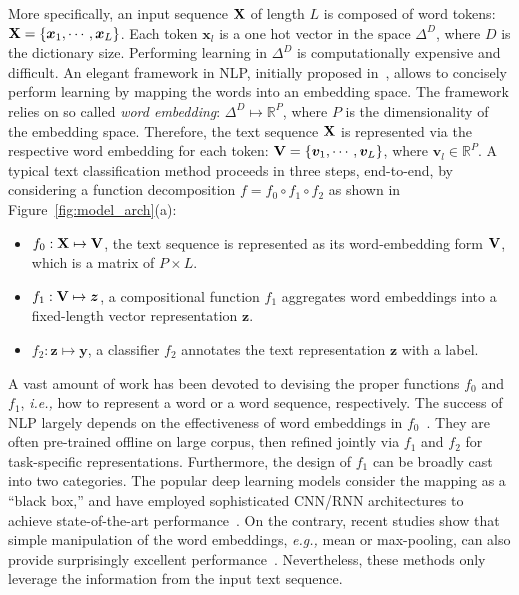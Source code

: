 \documentclass[11pt,a4paper]{article}
\newcommand{\ie}[0]{\emph{i.e., }}
\newcommand{\eg}[0]{\emph{e.g., }}
\newcommand{\Vmat}[0]{{{\bf V}}}
\newcommand{\Xmat}[0]{{{\bf X}}}
\newcommand{\vv}{\boldsymbol{v}}
\newcommand{\xv}{\boldsymbol{x}}
\newcommand{\yv}{\boldsymbol{y}}
\newcommand{\zv}{\boldsymbol{z}}
\newcommand{\R}{\mathbb{R}}
\begin{document}
More specifically, an input sequence $\Xmat$ of length $L$ is composed of word tokens: $\Xmat = \{\xv_1, \cdots, \xv_L\}$. Each token $\xv_{l}$ is a one hot vector in the space $\Delta^{D}$, where $D$ is the dictionary size. Performing learning in $\Delta^{D}$ is computationally expensive and difficult.
An elegant framework in NLP, initially proposed in~\cite{mikolov2013distributed,le2014distributed,pennington2014glove,kiros2015skip}, allows to concisely perform learning by mapping the words into an embedding space. The framework relies on so called {\em word embedding}: $\Delta^D \mapsto \R^P$, where $P$ is the dimensionality of the embedding space.
Therefore, the text sequence $\Xmat$ is represented via the respective word embedding for each token: $\Vmat = \{\vv_1, \cdots, \vv_L\}$, where $\vv_l \in \R^P$. A typical text classification method proceeds in three steps, end-to-end, by considering a function decomposition $f=f_0 \circ  f_1 \circ  f_2$ as shown in Figure~\ref{fig:model_arch}(a):
\begin{itemize}
	\item $f_0: \Xmat \mapsto \Vmat$, the text sequence is represented as its word-embedding form $\Vmat$, which is a matrix of $P \times L$. 
		\vspace{-2mm}
	\item $f_1: \Vmat \mapsto \zv$,  a compositional function $f_1$ aggregates word embeddings into a fixed-length vector representation $\zv$.
		\vspace{-2mm}
	\item $f_2: \zv \mapsto \yv$, a classifier $f_2$ annotates the text representation $\zv$ with a label.
\end{itemize}
A vast amount of work has been devoted to devising the proper functions $f_0$ and $f_1$, \ie how to represent a word or a word sequence, respectively. The success of NLP largely depends on the effectiveness of word embeddings in $f_0$~\cite{bengio2003neural,collobert2008unified,mikolov2013distributed,pennington2014glove}. They are often pre-trained offline on large corpus, then refined jointly via $f_1$ and $ f_2$ for task-specific representations. 
Furthermore, the design of $f_1$ can be broadly cast into two categories. The popular deep learning models consider the mapping as a ``black box,'' and have employed sophisticated CNN/RNN architectures to achieve state-of-the-art performance~\cite{zhang2015character,yang2016hierarchical}. On the contrary, recent studies show that simple manipulation of the word embeddings, \eg mean or max-pooling, can also provide surprisingly excellent performance~\cite{joulin2016bag,wieting2016towards,arora2017simple,shen2018on}. Nevertheless, these methods only leverage the information from the input text sequence.
\end{document}
